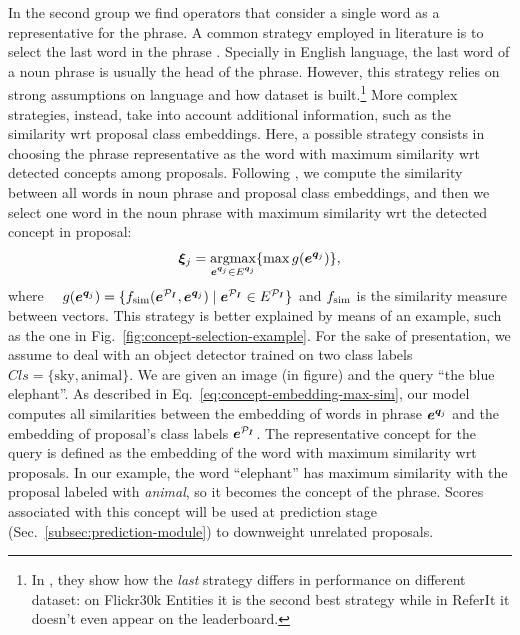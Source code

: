 In the second group we find operators that consider a single word as a
representative for the phrase. A common strategy employed in
literature is to select the last word in the phrase
\cite{wang2019phrase}. Specially in English language, the last word of
a noun phrase is usually the head of the phrase. However, this
strategy relies on strong assumptions on language and how dataset is
built.\footnote{In \cite{wang2019phrase}, they show how the
\textit{last} strategy differs in performance on different dataset: on
Flickr30k Entities it is the second best strategy while in ReferIt it
doesn't even appear on the
leaderboard.} More complex strategies,
instead, take into account additional information, such as the
similarity wrt proposal class embeddings. Here, a possible strategy
consists in choosing the phrase representative as the word with
maximum similarity wrt detected concepts among proposals. Following
\cite{wang2019phrase}, we compute the similarity between all words in
noun phrase and proposal class embeddings, and then we select one word
in the noun phrase with maximum similarity wrt the detected concept in
proposal:
\begin{equation}
  \bm{\xi}_j = \operatorname*{argmax}_{\bm{e}^{\bm{q}_j} \in E^{\bm{q}_j}} \{ \max g(\bm{e}^{\bm{q}_j}) \},
  \label{eq:concept-embedding-max-sim}
\end{equation}
where $\quad g(\bm{e}^{\bm{q}_j}) = \{ f_{\text{sim}}(\bm{e}^{\mathcal{P}_{\bm{I}}}, \bm{e}^{\bm{q}_j}) \mid \bm{e}^{\mathcal{P}_{\bm{I}}} \in E^{\mathcal{P}_{\bm{I}}} \}$ and
$f_{\text{sim}}$ is the similarity measure between vectors. This strategy is
better explained by means of an example, such as the one in
Fig.~\ref{fig:concept-selection-example}. For the sake of
presentation, we assume to deal with an object detector trained on two
class labels $Cls = \{ \text{sky}, \text{animal} \}$. We are given an
image (in figure) and the query ``the blue elephant''. As described in
Eq.~\ref{eq:concept-embedding-max-sim}, our model computes all
similarities between the embedding of words in phrase $\bm{e}^{\bm{q}_j}$ and the
embedding of proposal's class labels $\bm{e}^{\mathcal{P}_{\bm{I}}}$. The representative
concept for the query is defined as the embedding of the word with
maximum similarity wrt proposals. In our example, the word
``elephant'' has maximum similarity with the proposal labeled with
\textit{animal}, so it becomes the concept of the phrase. Scores
associated with this concept will be used at prediction stage
(Sec.~\ref{subsec:prediction-module}) to downweight unrelated
proposals.

